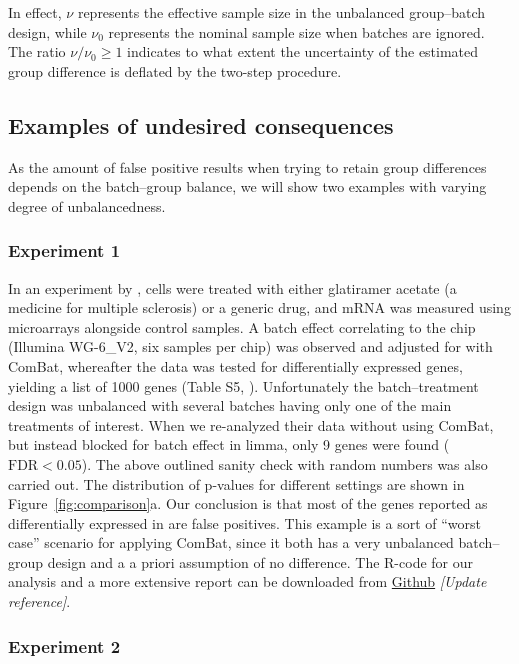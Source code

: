 \documentclass{bio}
\newcommand\NB[1]{\textcolor{NBcol}{\textit{#1}}}
\newcommand\NOTE[1]{\NB{[#1]}}
\begin{document}
In effect, $\nu$ represents the effective sample size in the unbalanced group--batch design, while $\nu_0$ represents the nominal sample size when batches are ignored. The ratio $\nu/\nu_0\ge1$ indicates to what extent the uncertainty of the estimated group difference is deflated by the two-step procedure.


\subsection{Examples of undesired consequences}

As the amount of false positive results when trying to retain group differences depends on the batch--group balance, we will show two examples with varying degree of unbalancedness. 

\subsubsection{Experiment 1}

In an experiment by \citet{Towfic2014}, cells were treated with either glatiramer acetate (a medicine for multiple sclerosis) or a generic drug, and mRNA was measured using microarrays alongside control samples. A batch effect correlating to the chip (Illumina WG-6\_V2, six samples per chip) was observed and adjusted for with ComBat, whereafter the data was tested for differentially expressed genes, yielding a list of 1000 genes (Table S5, \citealp{Towfic2014}). Unfortunately the batch--treatment design was unbalanced with several batches having only one of the main treatments of interest. When we re-analyzed their data without using ComBat, but instead blocked for batch effect in limma, only 9 genes were found ($\text{FDR}<0.05$). The above outlined sanity check with random numbers was also carried out. The distribution of p-values for different settings are shown in Figure~\ref{fig:comparison}a.  Our conclusion is that most of the genes reported as differentially expressed in \citet{Towfic2014} are false positives. This example is a sort of ``worst case'' scenario for applying ComBat, since it both has a very unbalanced batch--group design and a a priori assumption of no difference. The R-code for our analysis and a more extensive report can be downloaded from \href{https://github.com/vegardny/combat_tests.git}{Github} \NOTE{Update reference}.

\subsubsection{Experiment 2}
\end{document}
